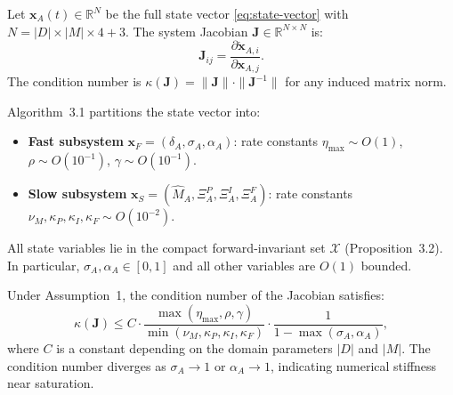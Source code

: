 
\begin{definition}
Let $\mathbf{x}_A(t) \in \mathbb{R}^N$ be the full state vector
\eqref{eq:state-vector} with $N = |D|\times|M|\times 4 + 3$. The system
Jacobian $\mathbf{J} \in \mathbb{R}^{N \times N}$ is:
\[
\mathbf{J}_{ij} = \frac{\partial \dot{\mathbf{x}}_{A,i}}{\partial \mathbf{x}_{A,j}}.
\]
The condition number is $\kappa(\mathbf{J}) = \|\mathbf{J}\| \cdot \|\mathbf{J}^{-1}\|$
for any induced matrix norm.
\end{definition}

\begin{definition}
Algorithm~3.1 partitions the state vector into:
\begin{itemize}[nosep]
\item \textbf{Fast subsystem} $\mathbf{x}_F = (\delta_A, \sigma_A, \alpha_A)$:
  rate constants $\eta_{\max} \sim O(1)$, $\rho \sim O(10^{-1})$, $\gamma \sim O(10^{-1})$.
\item \textbf{Slow subsystem} $\mathbf{x}_S = (\hat{M}_A, \Xi_A^P, \Xi_A^I, \Xi_A^F)$:
  rate constants $\nu_M, \kappa_P, \kappa_I, \kappa_F \sim O(10^{-2})$.
\end{itemize}
\end{definition}

\begin{assumption}
All state variables lie in the compact forward-invariant set
$\mathcal{X}$ (Proposition~3.2). In particular,
$\sigma_A, \alpha_A \in [0,1]$ and all other variables are
$O(1)$ bounded.
\end{assumption}

\begin{proposition}
\label{prop:stability}
Under Assumption~1, the condition number of the Jacobian satisfies:
\[
\kappa(\mathbf{J}) \leq C \cdot
\frac{\max(\eta_{\max}, \rho, \gamma)}{\min(\nu_M, \kappa_P, \kappa_I, \kappa_F)} \cdot
\frac{1}{1 - \max(\sigma_A, \alpha_A)},
\]
where $C$ is a constant depending on the domain parameters $|D|$ and
$|M|$. The condition number diverges as $\sigma_A \to 1$ or
$\alpha_A \to 1$, indicating numerical stiffness near saturation.
\end{proposition}

